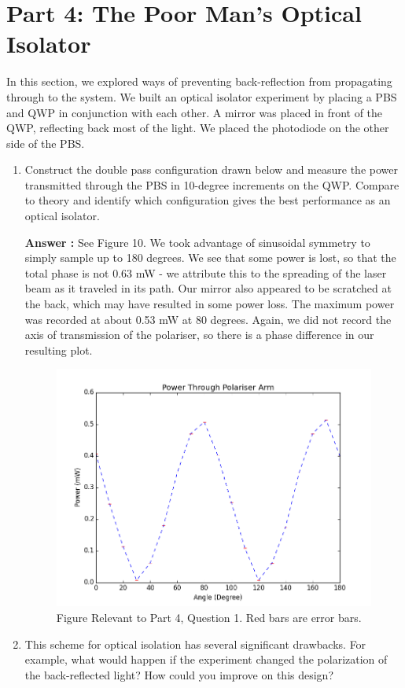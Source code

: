 \documentclass[10pt,a4paper]{article}
\begin{document}
\section*{Part 4: The Poor Man's Optical Isolator}
In this section, we explored ways of preventing back-reflection from propagating through to the system. We built an optical isolator experiment by placing a PBS and QWP in conjunction with each other. A mirror was placed in front of the QWP, reflecting back most of the light. We placed the photodiode on the other side of the PBS. 
\begin{enumerate}
\item Construct the double pass configuration drawn below and measure the power transmitted through the PBS in 10-degree increments on the QWP. Compare to theory and identify which configuration gives the best performance as an optical isolator.

\textbf{Answer :} See Figure 10. We took advantage of sinusoidal symmetry to simply sample up to 180 degrees. We see that some power is lost, so that the total phase is not 0.63 mW - we attribute this to the spreading of the laser beam as it traveled in its path. Our mirror also appeared to be scratched at the back, which may have resulted in some power loss. The maximum power was recorded at about 0.53 mW at 80 degrees. Again, we did not record the axis of transmission of the polariser, so there is a phase difference in our resulting plot. 
\begin{figure}[h]
\centering
\includegraphics[scale = 0.6]{../Analysis/figure_10.png}
\caption{Figure Relevant to Part 4, Question 1. Red bars are error bars.} 
\end{figure} 
\item This scheme for optical isolation has several significant drawbacks. For example, what would happen if the experiment changed the polarization of the back-­reflected light? How could you improve on this design?


\end{enumerate}
\end{document}
